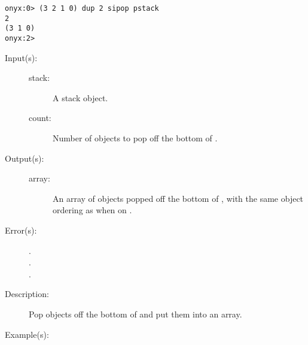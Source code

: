 \begin{description}
\begin{description}
\begin{verbatim}
onyx:0> (3 2 1 0) dup 2 sipop pstack
2
(3 1 0)
onyx:2>
		\end{verbatim}
	\end{description}
\label{systemdict:snbpop}
\item[{\onyxop{stack count}{snbpop}{array}}: ]
	\begin{description}\item[]
	\item[Input(s): ]
		\begin{description}\item[]
		\item[stack: ]
			A stack object.
		\item[count: ]
			Number of objects to pop off the bottom of
			.
		\end{description}
	\item[Output(s): ]
		\begin{description}\item[]
		\item[array: ]
			An array of objects popped off the bottom of
			, with the same object ordering as when on
			.
		\end{description}
	\item[Error(s): ]
		\begin{description}\item[]
		\item[.]
		\item[.]
		\item[.]
		\end{description}
	\item[Description: ]
		Pop  objects off the bottom of  and
		put them into an array.
	\item[Example(s): ]\begin{verbatim}


\end{verbatim}
\end{description}
\end{description}
